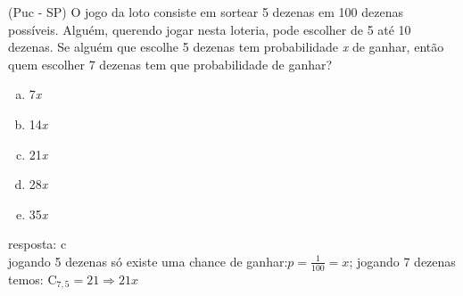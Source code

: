 \begin{ex}
(Puc - SP) O jogo da loto consiste em sortear 5 dezenas em 100 dezenas possíveis. Alguém, querendo jogar nesta loteria, pode escolher de 5 até 10 dezenas. Se alguém que escolhe 5 dezenas tem probabilidade \textit{x} de ganhar, então quem escolher 7 dezenas tem que probabilidade de ganhar?
    \begin{enumerate}[(a)]
    \item 7\textit{x}
    \item 14\textit{x}
    \item 21\textit{x}
    \item 28\textit{x}
    \item 35\textit{x}
    \end{enumerate}
      \begin{sol}
        resposta: c \\
        jogando 5 dezenas só existe uma chance de ganhar:\hspace{0.3cm}$p=\frac{1}{100}=x$; jogando 7 dezenas temos: $\mathrm{C}_{7,5}=21\Longrightarrow21x$
      \end{sol}
\end{ex}
